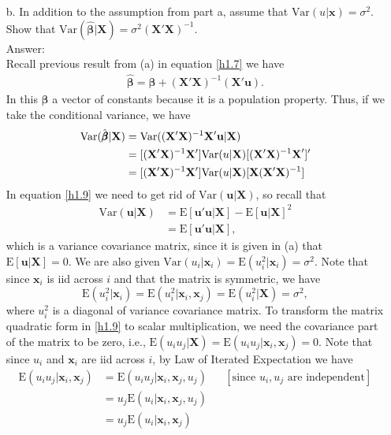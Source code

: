 \documentclass[10pt]{article}
\newcommand{\E}{\text{E}}
\newcommand{\V}{\text{Var}}
\begin{document}
\begin{enumerate}
\item[b.] In addition to the assumption from part a, assume that $\V(u|\mathbf{x})=\sigma^2.$ Show that $\V({\hat{\pmb{\beta}}}|\mathbf{X})=\sigma^2(\mathbf{X}'\mathbf{X})^{-1}.$
\\ Answer:\\
Recall previous result from (a) in equation \eqref{h1.7} we have
\begin{align*}
    \hat{\pmb{\beta}}=\pmb{\beta}+(\mathbf{X'X})^{-1}(\mathbf{X'u}).
\end{align*}
In this $\pmb{\beta}$ a vector of constants because it is a population property. Thus, if we take the conditional variance, we have
\begin{align}
    \V(\hat{\pmb{\beta}}|\textbf{X})&=\V((\mathbf{X'X})^{-1}\mathbf{X'u}|\textbf{X}) \notag \\
    &=[(\mathbf{X'X})^{-1}\mathbf{X'}]\V({u}|\textbf{X})[(\mathbf{X'X})^{-1}\textbf{X}']' \notag \\
    &=[(\mathbf{X'X})^{-1}\mathbf{X'}]\V({u}|\textbf{X})[\textbf{X}(\mathbf{X'X})^{-1}] \label{h1.9}
\end{align}
In equation \eqref{h1.9} we need to get rid of $\V({\textbf{u}}|\textbf{X})$, so recall that
\begin{align*}
\V({\textbf{u}}|\textbf{X})&=\E[\mathbf{u'u}|\textbf{X}]-\E[\mathbf{u}|\textbf{X}]^2 \\
&=\E[\mathbf{u'u}|\textbf{X}],
\end{align*}
which is a variance covariance matrix, since it is given in (a) that $\E[\mathbf{u}|\textbf{X}]=0.$ We are also given $\V(u_i|\mathbf{x}_i)=\E(u_i^2|\mathbf{x}_i)=\sigma^2$. Note that since $\textbf{x}_i$ is iid across $i$ and that the matrix is symmetric, we have \[\E(u_i^2|\mathbf{x}_i)=\E(u_i^2|\mathbf{x}_i,\mathbf{x}_j)=\E(u_i^2|\mathbf{X})=\sigma^2,\] 
where $u_i^2$ is a diagonal of variance covariance matrix. To transform the matrix quadratic form in \eqref{h1.9} to scalar multiplication, we need the covariance part of the matrix to be zero, i.e., $\E(u_iu_j|\mathbf{X})=\E(u_iu_j|\mathbf{x}_i,\mathbf{x}_j)=0$.  Note that since $u_i$ and $\textbf{x}_i$ are iid across $i$, by Law of Iterated Expectation we have 
\begin{align*}
    \E(u_iu_j|\mathbf{x}_i,\mathbf{x}_j)&=\E(u_iu_j|\mathbf{x}_i,\mathbf{x}_j,u_j)& &[\text{since } u_i,u_j \text{ are independent}]\\
    &=u_j\E(u_i|\mathbf{x}_i,\mathbf{x}_j,u_j)&\\
    &=u_j\E(u_i|\mathbf{x}_i,\mathbf{x}_j)&\\

\end{align*}
\end{enumerate}
\end{document}
